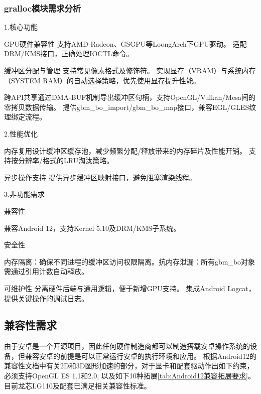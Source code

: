 \subsubsection{gralloc模块需求分析}
1.核心功能

    ​GPU硬件兼容性​
        支持AMD Radeon、GSGPU等LoongArch下GPU驱动。
        适配DRM/KMS接口，正确处理IOCTL命令。

    ​缓冲区分配与管理​
        支持常见像素格式及修饰符。
        实现显存（VRAM）与系统内存（SYSTEM RAM）的自动选择策略，优先使用显存提升性能。

    ​跨API共享​
        通过DMA-BUF机制导出缓冲区句柄，支持OpenGL/Vulkan/Mesa间的零拷贝数据传输。
        提供gbm\_bo\_import/gbm\_bo\_map接口，兼容EGL/GLES纹理绑定流程。

2.性能优化

    ​内存复用​​
        设计缓冲区缓存池，减少频繁分配/释放带来的内存碎片及性能开销。
        支持按分辨率/格式的LRU淘汰策略。

    ​异步操作支持​
        提供异步缓冲区映射接口，避免阻塞渲染线程。

3.非功能需求
        
        
    兼容性
        
      兼容Android 12，支持Kernel 5.10及DRM/KMS子系统。
        
    安全性
        
      ​内存隔离：确保不同进程的缓冲区访问权限隔离。
      ​抗内存泄漏：所有gbm\_bo对象需通过引用计数自动释放。
        
    可维护性
      分离硬件后端与通用逻辑，便于新增GPU支持。
      集成Android Logcat，提供关键操作的调试日志。

\subsection{兼容性需求}
由于安卓是一个开源项目，因此任何硬件制造商都可以制造搭载安卓操作系统的设备，但兼容安卓的前提是可以正常运行安卓的执行环境和应用。
根据Android12的兼容性文档\cite{Android-12-cdd}中有关2D和3D图形加速的部分，对于显卡和配套驱动作出如下约束，必须支持OpenGL ES 1.1和2.0,
以及如下10种拓展\ref{tab:Android12兼容拓展要求}。目前龙芯LG110及配套已满足相关兼容性标准。

